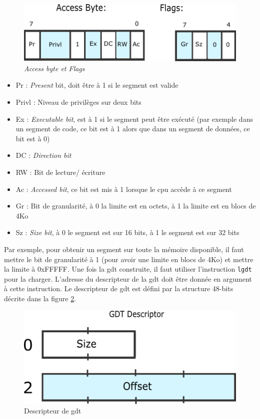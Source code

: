 \documentclass[a4paper, 12pt]{article}
\begin{document}
\begin{figure}[!h]
  \centering
  \includegraphics[scale=0.75]{images/gdt_bits.png}
  \caption{\textit{Access byte et Flags}}
  \label{gdt_bits}
\end{figure}

\begin{itemize}[label=\textbullet]
	\item Pr : \textit{Present} bit, doit être à 1 si le segment est valide
	\item Privl : Niveau de privilèges sur deux bits
	\item Ex : \textit{Executable bit}, est à 1 si le segment peut être exécuté
    (par exemple dans un segment de code, ce bit est à 1 alors que dans un segment
    de données, ce bit est à 0)
    \item DC : \textit{Direction bit}
    \item RW : Bit de lecture/ écriture
    \item Ac : \textit{Accessed bit}, ce bit est mis à 1 lorsque le \acrshort{cpu}
    accède à ce segment
    \item Gr : Bit de granularité, à 0 la limite est en octets, à 1 la limite est en blocs
    de 4Ko
    \item Sz : \textit{Size bit}, à 0 le segment est sur 16 bits, à 1 le segment
    est sur 32 bits
\end{itemize}

Par exemple, pour obtenir un segment sur toute la mémoire disponible, il faut mettre
le bit de granularité à 1 (pour avoir une limite en blocs de 4Ko) et mettre la
limite à 0xFFFFF. Une fois la \acrshort{gdt} construite, il faut utiliser l'instruction
\texttt{lgdt} pour la charger. L'adresse du descripteur de la \acrshort{gdt}
doit être donnée en argument à cette instruction. Le descripteur de \acrshort{gdt}
est défini par la structure 48-bits décrite dans la figure \ref{gdt_descriptor}.\cite{ref14}

\begin{figure}[!h]
  \centering
  \includegraphics[scale=0.5]{images/gdt_descriptor.png}
  \caption{Descripteur de \acrshort{gdt}}
  \label{gdt_descriptor}
\end{figure}
\end{document}

